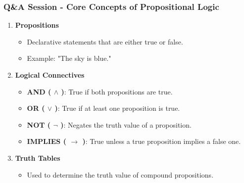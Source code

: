 \documentclass[aspectratio=169]{beamer}
\begin{document}
\begin{frame}[fragile]
    \frametitle{Q\&A Session - Core Concepts of Propositional Logic}
    \begin{enumerate}
        \item \textbf{Propositions}
        \begin{itemize}
            \item Declarative statements that are either true or false.
            \item Example: "The sky is blue."
        \end{itemize}
        
        \item \textbf{Logical Connectives}
        \begin{itemize}
            \item \textbf{AND ( $\land$ )}: True if both propositions are true.
            \item \textbf{OR ( $\lor$ )}: True if at least one proposition is true.
            \item \textbf{NOT ( $\neg$ )}: Negates the truth value of a proposition.
            \item \textbf{IMPLIES ( $\rightarrow$ )}: True unless a true proposition implies a false one.
        \end{itemize}
        
        \item \textbf{Truth Tables}
        \begin{itemize}
            \item Used to determine the truth value of compound propositions.
        \end{itemize}
    \end{enumerate}
\end{frame}
\end{document}
